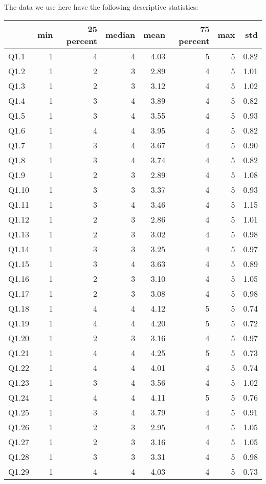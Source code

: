 \documentclass[
]{article}
\begin{document}
The data we use here have the following descriptive statistics:

\begin{center}
\begin{longtable}{lrrrrrrr}
\toprule
  & min & 25 percent & median & mean & 75 percent & max & std\\
\midrule
Q1.1 & 1 & 4 & 4 & 4.03 & 5 & 5 & 0.82\\
Q1.2 & 1 & 2 & 3 & 2.89 & 4 & 5 & 1.01\\
Q1.3 & 1 & 2 & 3 & 3.12 & 4 & 5 & 1.02\\
Q1.4 & 1 & 3 & 4 & 3.89 & 4 & 5 & 0.82\\
Q1.5 & 1 & 3 & 4 & 3.55 & 4 & 5 & 0.93\\
\addlinespace
Q1.6 & 1 & 4 & 4 & 3.95 & 4 & 5 & 0.82\\
Q1.7 & 1 & 3 & 4 & 3.67 & 4 & 5 & 0.90\\
Q1.8 & 1 & 3 & 4 & 3.74 & 4 & 5 & 0.82\\
Q1.9 & 1 & 2 & 3 & 2.89 & 4 & 5 & 1.08\\
Q1.10 & 1 & 3 & 3 & 3.37 & 4 & 5 & 0.93\\
\addlinespace
Q1.11 & 1 & 3 & 4 & 3.46 & 4 & 5 & 1.15\\
Q1.12 & 1 & 2 & 3 & 2.86 & 4 & 5 & 1.01\\
Q1.13 & 1 & 2 & 3 & 3.02 & 4 & 5 & 0.98\\
Q1.14 & 1 & 3 & 3 & 3.25 & 4 & 5 & 0.97\\
Q1.15 & 1 & 3 & 4 & 3.63 & 4 & 5 & 0.89\\
\addlinespace
Q1.16 & 1 & 2 & 3 & 3.10 & 4 & 5 & 1.05\\
Q1.17 & 1 & 2 & 3 & 3.08 & 4 & 5 & 0.98\\
Q1.18 & 1 & 4 & 4 & 4.12 & 5 & 5 & 0.74\\
Q1.19 & 1 & 4 & 4 & 4.20 & 5 & 5 & 0.72\\
Q1.20 & 1 & 2 & 3 & 3.16 & 4 & 5 & 0.97\\
\addlinespace
Q1.21 & 1 & 4 & 4 & 4.25 & 5 & 5 & 0.73\\
Q1.22 & 1 & 4 & 4 & 4.01 & 4 & 5 & 0.74\\
Q1.23 & 1 & 3 & 4 & 3.56 & 4 & 5 & 1.02\\
Q1.24 & 1 & 4 & 4 & 4.11 & 5 & 5 & 0.76\\
Q1.25 & 1 & 3 & 4 & 3.79 & 4 & 5 & 0.91\\
\addlinespace
Q1.26 & 1 & 2 & 3 & 2.95 & 4 & 5 & 1.05\\
Q1.27 & 1 & 2 & 3 & 3.16 & 4 & 5 & 1.05\\
Q1.28 & 1 & 3 & 3 & 3.31 & 4 & 5 & 0.98\\
Q1.29 & 1 & 4 & 4 & 4.03 & 4 & 5 & 0.73\\
\bottomrule
\end{longtable}\end{center}
\end{document}
